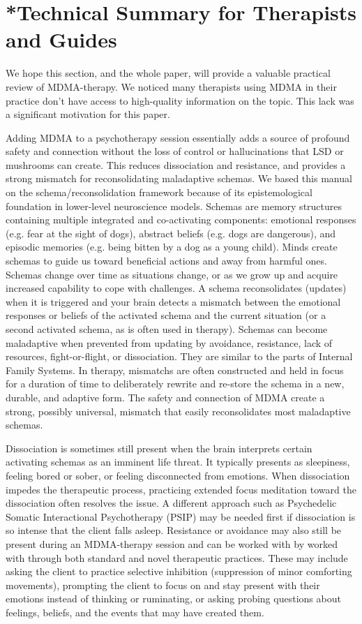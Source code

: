\documentclass[12pt,letterpaper]{article}
\begin{document}
\section{*Technical Summary for Therapists and Guides}
We hope this section, and the whole paper, will provide a valuable practical review of MDMA-therapy. We noticed many therapists using MDMA in their practice don't have access to high-quality information on the topic. This lack was a significant motivation for this paper.

Adding MDMA to a psychotherapy session essentially adds a source of profound safety and connection without the loss of control or hallucinations that LSD or mushrooms can create. This reduces dissociation and resistance, and provides a strong mismatch for reconsolidating maladaptive schemas. We based this manual on the schema/reconsolidation framework because of its epistemological foundation in lower-level neuroscience models. Schemas are memory structures containing multiple integrated and co-activating components: emotional responses (e.g. fear at the sight of dogs), abstract beliefs (e.g. dogs are dangerous), and episodic memories (e.g. being bitten by a dog as a young child). Minds create schemas to guide us toward beneficial actions and away from harmful ones. Schemas change over time as situations change, or as we grow up and acquire increased capability to cope with challenges. A schema reconsolidates (updates) when it is triggered and your brain detects a mismatch between the emotional responses or beliefs of the activated schema and the current situation (or a second activated schema, as is often used in therapy). Schemas can become maladaptive when prevented from updating by avoidance, resistance, lack of resources, fight-or-flight, or dissociation. They are similar to the parts of Internal Family Systems. In therapy, mismatchs are often constructed and held in focus for a duration of time to deliberately rewrite and re-store the schema in a new, durable, and adaptive form. The safety and connection of MDMA create a strong, possibly universal, mismatch that easily reconsolidates most maladaptive schemas.

Dissociation is sometimes still present when the brain interprets certain activating schemas as an imminent life threat. It typically presents as sleepiness, feeling bored or sober, or feeling disconnected from emotions. When dissociation impedes the therapeutic process, practicing extended focus meditation toward the dissociation often resolves the issue. A different approach such as Psychedelic Somatic Interactional Psychotherapy (PSIP) may be needed first if dissociation is so intense that the client falls asleep. Resistance or avoidance may also still be present during an MDMA-therapy session and can be worked with by worked with through both standard and novel therapeutic practices. These may include asking the client to practice selective inhibition (suppression of minor comforting movements), prompting the client to focus on and stay present with their emotions instead of thinking or ruminating, or asking probing questions about feelings, beliefs, and the events that may have created them.
\end{document}
